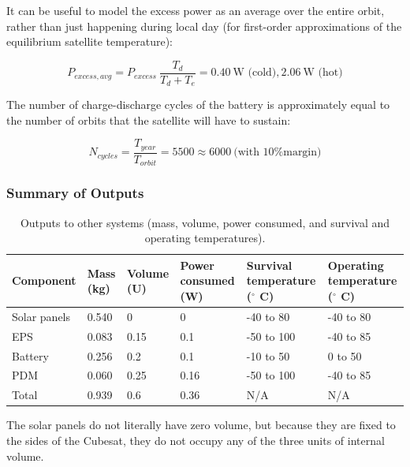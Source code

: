 \documentclass[12pt]{article}
\begin{document}
It can be useful to model the excess power as an average over the entire orbit, rather than just happening during local day (for first-order approximations of the equilibrium satellite temperature):

\begin{equation}
P_{excess,avg} = P_{excess} \: \frac{T_d}{T_d + T_e} = 0.40 \ \text{W (cold)}, 2.06 \ \text{W (hot)}
\label{eq:power-excess-avg}
\end{equation}

The number of charge-discharge cycles of the battery is approximately equal to the number of orbits that the satellite will have to sustain:

\begin{equation}
N_{cycles} = \frac{T_{year}}{T_{orbit}} = 5500 \approx 6000 \ \text{(with 10\% margin)}
\label{eq:power-num-cycles}
\end{equation}

			\subsubsection{Summary of Outputs}

\begin{table}[ht]\label{table:power-outputs}
\caption{Outputs to other systems (mass, volume, power consumed, and survival and operating temperatures).\cite{EPS-manual} \cite{PDM-manual} \cite{Battery-manual} \cite{Solar-panel-datasheet}}
\begin{center}
    \begin{tabular}{|l|l|l|p{0.8in}|p{1in}|p{1.1in}|} \hline
Component & Mass (kg) & Volume (U) & Power consumed (W) & Survival temperature ($^\circ$ C) & Operating temperature ($^\circ$ C) \\ \hline \hline
Solar panels & 0.540 & 0 & 0 & -40 to 80 & -40 to 80 \\\hline
EPS & 0.083 & 0.15 & 0.1 & -50 to 100 & -40 to 85 \\\hline
Battery & 0.256 & 0.2 & 0.1 & -10 to 50 & 0 to 50 \\\hline
PDM & 0.060 & 0.25 & 0.16 & -50 to 100 & -40 to 85 \\\hline \hline
Total & 0.939 & 0.6 & 0.36 & N/A & N/A \\\hline
    \end{tabular}
\end{center}
\end{table}

The solar panels do not literally have zero volume, but because they are fixed to the sides of the Cubesat, they do not occupy any of the three units of internal volume.
\end{document}
